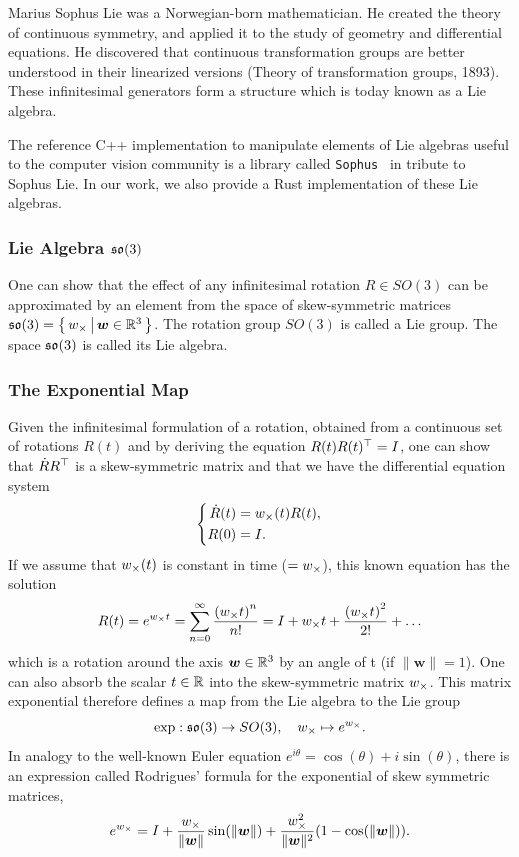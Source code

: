 Marius Sophus Lie was a Norwegian-born mathematician.
He created the theory of continuous symmetry, and applied it to
the study of geometry and differential equations.
He discovered that continuous transformation
groups are better understood in their linearized versions
(Theory of transformation groups, 1893).
These infinitesimal generators form a structure which is today
known as a Lie algebra.

The reference C++ implementation to manipulate elements of
Lie algebras useful to the computer vision community
is a library called \verb|Sophus|~\cite{sophus} in tribute to Sophus Lie.
In our work, we also provide a Rust implementation
of these Lie algebras.


\subsubsection{Lie Algebra $\mathfrak{so}(3)$}%
\label{ssub:lie_algebra_so3}

One can show that the effect of any infinitesimal
rotation $R \in SO(3)$ can be approximated by an element from
the space of skew-symmetric matrices
$\mathfrak{so}(3) = \left\{\, {{w}_{\times}} \, \middle| \, {\bm{w} \in \mathbb{R}^3} \,\right\}$.
The rotation group $SO(3)$ is called a Lie group.
The space $\mathfrak{so}(3)$ is called its Lie algebra.


\subsubsection{The Exponential Map}%
\label{ssub:the_exponential_map}

Given the infinitesimal formulation of a rotation,
obtained from a continuous set of rotations $R(t)$
and by deriving the equation $R(t)R(t)^{\top} = I$,
one can show that $\dot{R}R^{\top}$ is a skew-symmetric matrix
and that we have the differential equation system
\[\left\{
	\begin{aligned}
		\dot{R}(t) &= {w}_{\times}(t)R(t), \\
		R(0) &= I. \\
	\end{aligned}
\right.\]
If we assume that ${w}_{\times}(t)$ is constant in time ($={w}_{\times}$),
this known equation has the solution
\[
	R(t) = e^{{w}_{\times}t}
		= \sum_{n=0}^{\infty} \frac{{({w}_{\times}t)}^n }{n!}
		= I + {w}_{\times}t + \frac{{({w}_{\times}t)}^2 }{2!} + \ldots
\]
which is a rotation around the axis $\bm{w} \in \mathbb{R}^3$
by an angle of t (if $\|\bm{w}\| = 1$).
One can also absorb the scalar $t \in \mathbb{R}$ into the skew-symmetric matrix ${w}_{\times}$.
This matrix exponential therefore defines a map from
the Lie algebra to the Lie group
\[
	\exp : \mathfrak{so}(3) \rightarrow SO(3), \quad {w}_{\times}\mapsto e^{{w}_{\times}}.
\]
In analogy to the well-known Euler equation
$e^{i\theta} = \cos(\theta) + i \sin(\theta)$,
there is an expression called Rodrigues' formula for
the exponential of skew symmetric matrices,
\[
	e^{{w}_{\times}} = I + \frac{{w}_{\times}}{\|\bm{w}\|} \sin(\|\bm{w}\|)
		+ \frac{{w}_{\times}^2}{\|\bm{w}\|^2} (1 - \cos(\|\bm{w}\|)).
\]

